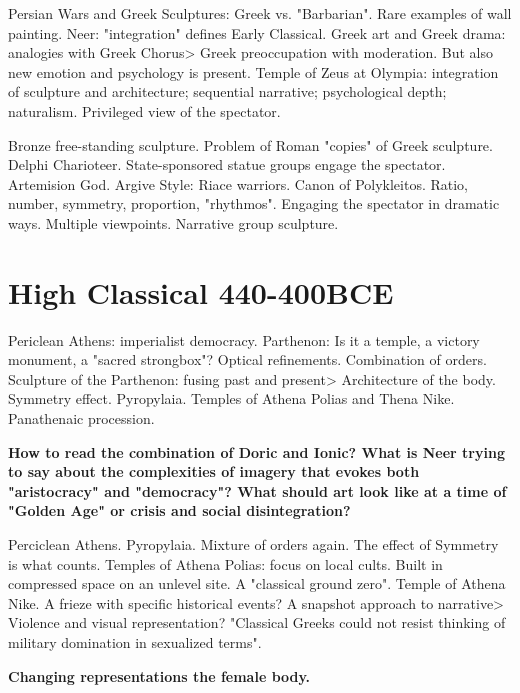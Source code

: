 \documentclass[10pt]{armath}
\begin{document}
\begin{multicols}{2}
Persian Wars and Greek Sculptures: Greek vs. "Barbarian". Rare examples of wall
painting. Neer: "integration" defines Early Classical. Greek art and Greek
drama: analogies with Greek Chorus> Greek preoccupation with moderation. But
also new emotion and psychology is present. Temple of Zeus at Olympia:
integration of sculpture and architecture; sequential narrative; psychological
depth; naturalism. Privileged view of the spectator.

Bronze free-standing sculpture. Problem of Roman "copies" of Greek sculpture.
Delphi Charioteer. State-sponsored statue groups engage the spectator.
Artemision God. Argive Style: Riace warriors. Canon of Polykleitos. Ratio,
number, symmetry, proportion, "rhythmos". Engaging the spectator in dramatic
ways. Multiple viewpoints. Narrative group sculpture.

\section{High Classical 440-400BCE}%
\label{sec:high_classical_440_400bce}

Periclean Athens: imperialist democracy. Parthenon: Is it a temple, a victory
monument, a "sacred strongbox"? Optical refinements. Combination of orders.
Sculpture of the Parthenon: fusing past and present> Architecture of the body.
Symmetry effect. Pyropylaia. Temples of Athena Polias and Thena Nike.
Panathenaic procession.

\textbf{How to read the combination of Doric and Ionic? What is Neer trying to
say about the complexities of imagery that evokes both "aristocracy" and
"democracy"? What should art look like at a time of "Golden Age" or crisis and
social disintegration?} 

Perciclean Athens. Pyropylaia. Mixture of orders again. The effect of Symmetry
is what counts. Temples of Athena Polias: focus on local cults. Built in
compressed space on an unlevel site. A "classical ground zero". Temple of
Athena Nike. A frieze with specific historical events? A snapshot approach to
narrative> Violence and visual representation? "Classical Greeks could not
resist thinking of military domination in sexualized terms".

\textbf{Changing representations the female body.} 

\end{multicols}
\end{document}
